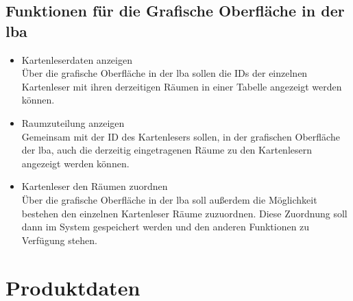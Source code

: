 \subsection{Funktionen für die Grafische Oberfläche in der \gls{lba}}
\begin{itemize}[leftmargin=1.0in]
    \item [\lf] Kartenleserdaten anzeigen \\
        Über die grafische Oberfläche in der \gls{lba} sollen die IDs der einzelnen Kartenleser mit ihren derzeitigen Räumen in einer Tabelle angezeigt werden können.
    \item [\lf] Raumzuteilung anzeigen \\
        Gemeinsam mit der ID des Kartenlesers sollen, in der grafischen Oberfläche der \gls{lba}, auch die derzeitig eingetragenen Räume zu den Kartenlesern angezeigt werden können. 
    \item [\lf] Kartenleser den Räumen zuordnen \\
        Über die grafische Oberfläche in der \gls{lba} soll außerdem die Möglichkeit bestehen den einzelnen Kartenleser Räume zuzuordnen. Diese Zuordnung soll dann im System gespeichert werden und den anderen Funktionen zu Verfügung stehen.
\end{itemize}


\section{Produktdaten}
